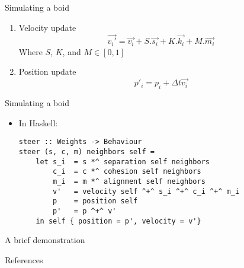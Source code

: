 \documentclass{beamer}
\begin{document}
\begin{frame}[fragile]
    \huge{Simulating a boid}\normalsize
    \begin{enumerate}
    \item<1-> Velocity update
    \begin{equation*}
    \vec{v_i\prime} = \vec{v_i} + S.\vec{s_i} + K.\vec{k_i} + M.\vec{m_i}
    \end{equation*}
        Where $S$, $K$, and $M \in [0,1]$
    \item<2-> Position update
    \begin{equation*}
    p\prime_i = p_i + \Delta t\vec{v_i}
    \end{equation*}
    \end{enumerate}
\end{frame}

\begin{frame}[fragile]
    \huge{Simulating a boid}\normalsize
    \begin{itemize}
    \item In Haskell:
        \begin{verbatim}
steer :: Weights -> Behaviour
steer (s, c, m) neighbors self =
    let s_i  = s *^ separation self neighbors
        c_i  = c *^ cohesion self neighbors
        m_i  = m *^ alignment self neighbors
        v'   = velocity self ^+^ s_i ^+^ c_i ^+^ m_i
        p    = position self
        p'   = p ^+^ v'
    in self { position = p', velocity = v'}
        \end{verbatim}
    \end{itemize}
\end{frame}

\begin{frame}
    \huge{A brief demonstration}\normalsize
\end{frame}

\renewcommand{\pgfuseimage}[1]{\texttt{[image: \#1]}}

\begin{frame}
\huge{References}\normalsize
\tiny{

 
 
}
\end{frame}
\end{document}
